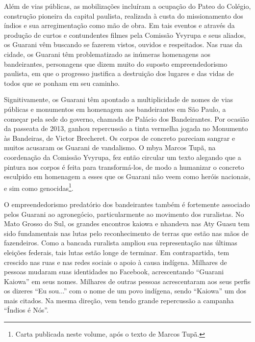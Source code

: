 \documentclass{article}
\begin{document}
Al\'em de vias p\'ublicas, as mobiliza\c{c}\~oes inclu\'iram a
ocupa\c{c}\~ao do Pateo do Col\'egio, constru\c{c}\~ao pioneira da
capital paulista, realizada \`a custa do missionamento dos \'indios e
sua arregimenta\c{c}\~ao como m\~ao de obra. Em tais eventos e
atrav\'es da produ\c{c}\~ao de curtos e contundentes filmes pela
Comiss\~ao Yvyrupa e seus aliados, os Guarani v\^em buscando se fazerem
vistos, ouvidos e respeitados. Nas ruas da cidade, os Guarani t\^em
problematizado as in\'umeras homenagens aos bandeirantes, personagens
que dizem muito do suposto empreendedorismo paulista, em que o
progresso justifica a destrui\c{c}\~ao dos lugares e das vidas de todos
que se ponham em seu caminho.

Signitivamente, os Guarani t\^em apontado a multiplicidade de nomes de
vias p\'ublicas e monumentos em homenagem aos bandeirantes em S\~ao
Paulo, a come\c{c}ar pela sede do governo, chamada de Pal\'acio dos
Bandeirantes. Por ocasi\~ao da passeata de 2013, ganhou repercuss\~ao a
tinta vermelha jogada no Monumento \`as Bandeiras, de Victor Brecheret.
Os corpos de concreto pareciam sangrar e muitos acusaram os Guarani de
vandalismo. O mbya Marcos Tup\~a, na coordena\c{c}\~ao da Comiss\~ao
Yvyrupa, fez ent\~ao circular um texto alegando que a pintura nos
corpos \'e feita para transform\'a-los, de modo a humanizar o concreto
esculpido em homenagem a esses que os Guarani n\~ao veem como her\'ois
nacionais, e sim como genocidas\footnote{  Carta publicada neste
volume, ap\'os o texto de Marcos Tup\~a.}.

O empreendedorismo predat\'orio dos bandeirantes tamb\'em \'e fortemente
associado pelos Guarani ao agroneg\'ocio, particularmente ao movimento
dos ruralistas. No Mato Grosso do Sul, os grandes encontros kaiowa e
nhandeva nas Aty Guasu tem sido fundamentais nas lutas pelo
reconhecimento de terras que est\~ao nas m\~aos de fazendeiros. Como a
bancada ruralista ampliou sua representa\c{c}\~ao nas \'ultimas
elei\c{c}\~oes federais, tais lutas est\~ao longe de terminar. Em
contrapartida, tem crescido nas ruas e nas redes sociais o apoio \`a
causa ind\'igena. Milhares de pessoas mudaram suas identidades no
Facebook, acrescentando {\textquotedblleft}Guarani
Kaiowa{\textquotedblright} em seus nomes. Milhares de outras pessoas
acrescentaram aos seus perfis os dizeres {\textquotedblleft}Eu
sou...{\textquotedblright} com o nome de um povo ind\'igena, sendo
{\textquotedblleft}Kaiowa{\textquotedblright} um dos mais citados. Na
mesma dire\c{c}\~ao, vem tendo grande repercuss\~ao a campanha
{\textquotedblleft}\'Indios \'e N\'os{\textquotedblright}.
\end{document}
